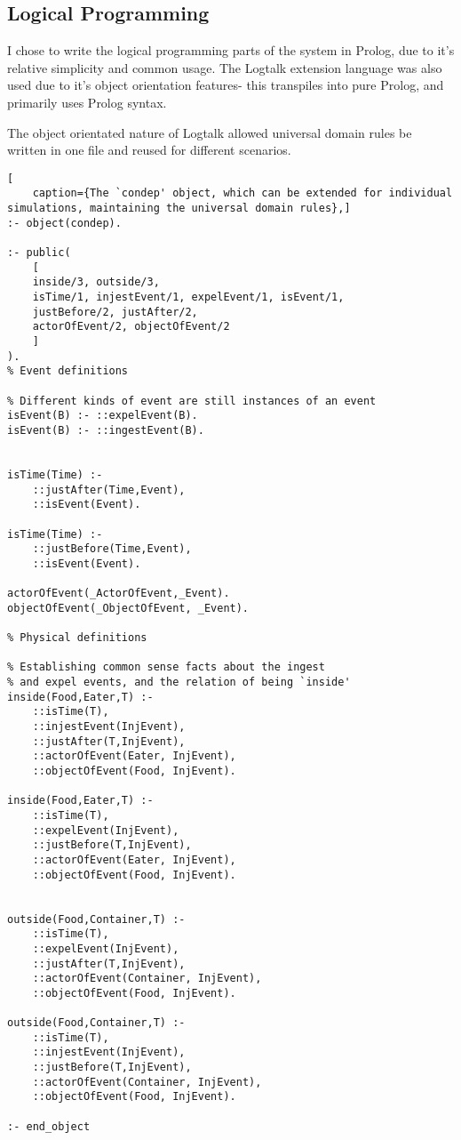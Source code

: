 \documentclass[report]{subfiles}
\begin{document}
\subsection{Logical Programming}

I chose to write the logical programming parts of the system in Prolog, due to it's relative simplicity and common usage. The Logtalk extension language was also used due to it's object orientation features- this transpiles into pure Prolog, and primarily uses Prolog syntax.

The object orientated nature of Logtalk allowed universal domain rules be written in one file and reused for different scenarios. 




\begin{lstlisting}[
    caption={The `condep' object, which can be extended for individual simulations, maintaining the universal domain rules},]
:- object(condep).

:- public(
    [
    inside/3, outside/3,
    isTime/1, injestEvent/1, expelEvent/1, isEvent/1,
    justBefore/2, justAfter/2,
    actorOfEvent/2, objectOfEvent/2
    ]
).
% Event definitions

% Different kinds of event are still instances of an event
isEvent(B) :- ::expelEvent(B).
isEvent(B) :- ::ingestEvent(B).


isTime(Time) :-
    ::justAfter(Time,Event),
    ::isEvent(Event).

isTime(Time) :-
    ::justBefore(Time,Event),
    ::isEvent(Event).

actorOfEvent(_ActorOfEvent,_Event).
objectOfEvent(_ObjectOfEvent, _Event).

% Physical definitions

% Establishing common sense facts about the ingest
% and expel events, and the relation of being `inside'
inside(Food,Eater,T) :-
    ::isTime(T),
    ::injestEvent(InjEvent),
    ::justAfter(T,InjEvent),
    ::actorOfEvent(Eater, InjEvent),
    ::objectOfEvent(Food, InjEvent).

inside(Food,Eater,T) :-
    ::isTime(T),
    ::expelEvent(InjEvent),
    ::justBefore(T,InjEvent),
    ::actorOfEvent(Eater, InjEvent),
    ::objectOfEvent(Food, InjEvent).


outside(Food,Container,T) :-
    ::isTime(T),
    ::expelEvent(InjEvent),
    ::justAfter(T,InjEvent),
    ::actorOfEvent(Container, InjEvent),
    ::objectOfEvent(Food, InjEvent).

outside(Food,Container,T) :-
    ::isTime(T),
    ::injestEvent(InjEvent),
    ::justBefore(T,InjEvent),
    ::actorOfEvent(Container, InjEvent),
    ::objectOfEvent(Food, InjEvent).

:- end_object
    
\end{lstlisting}
\end{document}
